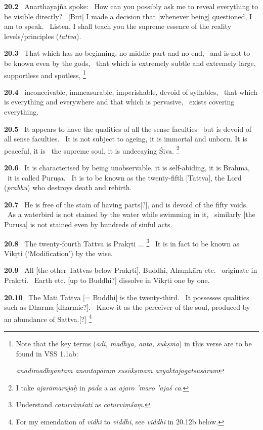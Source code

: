 \documentclass{article}
\newcommand{\skt}[1]{\textit{#1}}
\begin{document}
\textbf{20.2}%
\ Anarthayajña spoke:%
\ How can you possibly ask me to reveal everything to be visible directly?%
\ [But] I made a decision that [whenever being] questioned, I am to speak.%
\ Listen, I shall teach you the supreme essence of the reality levels/principles (\skt{tattva}).%


\textbf{20.3}%
\ That which has no beginning, no middle part and no end,%
\                 and is not to be known even by the gods,%
\ that which is extremely subtle and extremely large, supportless and spotless,%
\footnote{Note that the key terms (\skt{ādi, madhya, anta, sūkṣma}) in this verse are to be found in VSS 1.1ab:                

               \skt{ anādimadhyāntam anantapāraṃ
                 susūkṣmam avyaktajagatsusāram} }%


\textbf{20.4}%
\ inconceivable, immeasurable, imperishable, devoid of syllables,%
\ that which is everything and everywhere and that which is pervasive,%
\                         exists covering everything.%


\textbf{20.5}%
\ It appears to have the qualities of all the sense faculties%
\                          but is devoid of all sense faculties.%
\ It is not subject to ageing, it is immortal and unborn. It is peaceful, it is%
\                 the supreme soul, it is undecaying Śiva.%
\footnote{I take \skt{ajarāmarajaḥ} in \skt{pāda} a as \skt{ajaro 'maro 'ajaś ca}. }%


\textbf{20.6}%
\ It is characterised by being unobservable, it is self-abiding, it is Brahmā,%
\                         it is called Puruṣa.%
\ It is to be known as the twenty-fifth [Tattva], the Lord (\skt{prabhu}) who destroys death and rebirth.%


\textbf{20.7}%
\ He is free of the stain of having parts[?], and is devoid of the fifty voids.%
\ As a waterbird is not stained by the water while swimming in it,%
\ similarly [the Puruṣa] is not stained even by hundreds of sinful acts.%


\textbf{20.8}%
\ The twenty-fourth Tattva is Prakṛti ...%
\footnote{Understand \skt{caturviṃśati} as \skt{caturviṃśaṃ}. }%
\ It is in fact to be known as Vikṛti (`Modification') by the wise.%


\textbf{20.9}%
\ All [the other Tattvas below Prakṛti], Buddhi, Ahaṃkāra etc.%
\                         originate in Prakṛti.%
\ Earth etc. [up to Buddhi?] dissolve in Vikṛti one by one.%


\textbf{20.10}%
\ The Mati Tattva [= Buddhi] is the twenty-third.%
\                        It possesses qualities such as Dharma [dharmic?].%
\ Know it as the perceiver of the soul, produced by an abundance of Sattva.[?]%
\footnote{For my emendation of \skt{vidhi} to \skt{viddhi}, see \skt{viddhi} in 20.12b below. }%
\end{document}
